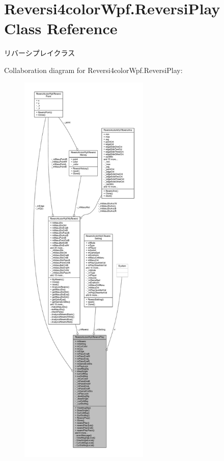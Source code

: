 \hypertarget{class_reversi4color_wpf_1_1_reversi_play}{}\section{Reversi4color\+Wpf.\+Reversi\+Play Class Reference}
\label{class_reversi4color_wpf_1_1_reversi_play}


リバーシプレイクラス  




Collaboration diagram for Reversi4color\+Wpf.\+Reversi\+Play\+:
\nopagebreak
\begin{figure}[H]
\begin{center}
\leavevmode
\includegraphics[height=550pt]{class_reversi4color_wpf_1_1_reversi_play__coll__graph}
\end{center}
\end{figure}
